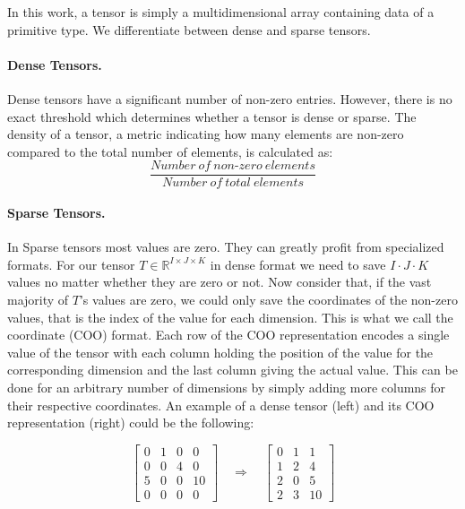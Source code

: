 \noindent
In this work, a tensor is simply a multidimensional array containing data of a
primitive type. We differentiate between dense and sparse tensors.

\paragraph{Dense Tensors.}
Dense tensors have a significant number of non-zero entries. However, there is no
exact threshold which determines whether a tensor is dense or sparse. The density
of a tensor, a metric indicating how many elements are non-zero compared to the total
number of elements, is calculated as:
\begin{equation*}
    \frac{Number\ of\ non\text{-}zero\ elements}{Number\ of\ total\ elements}
\end{equation*}

\paragraph{Sparse Tensors.}
In Sparse tensors most values are zero. They can greatly profit from specialized
formats. For our tensor $T \in \mathbb{R}^{I \times J \times K}$ in dense format
we need to save $I \cdot J \cdot K$ values no matter whether they are zero or not.
Now consider that, if the vast majority of $T$'s values are zero, we could only save
the coordinates of the non-zero values, that is the index of the value for each
dimension. This is what we call the coordinate (COO) format. Each row of the COO
representation encodes a single value of the tensor with each column holding the
position of the value for the corresponding dimension and the last column giving
the actual value. This can be done for an arbitrary number of dimensions by simply
adding more columns for their respective coordinates. An example of a dense tensor
(left) and its COO representation (right) could be the following:

\begin{equation*}
    \begin{bmatrix}
        0 & 1 & 0 & 0  \\
        0 & 0 & 4 & 0  \\
        5 & 0 & 0 & 10 \\
        0 & 0 & 0 & 0
    \end{bmatrix}
    \quad
    \Rightarrow
    \quad
    \begin{bmatrix}
        0 & 1 & 1  \\
        1 & 2 & 4  \\
        2 & 0 & 5  \\
        2 & 3 & 10
    \end{bmatrix}
\end{equation*}

